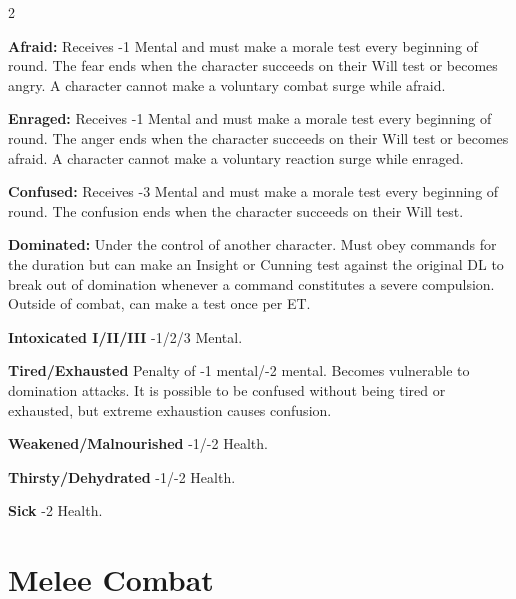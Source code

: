 \begin{multicols}{2}
\begin{proplist}
\item \textbf{Afraid:} Receives -1 Mental and must make a morale test every beginning of round. The fear ends when the character succeeds on their Will test or becomes angry. A character cannot make a voluntary combat surge while afraid.
\item \textbf{Enraged:} Receives -1 Mental and must make a morale test every beginning of round. The anger ends when the character succeeds on their Will test or becomes afraid. A character cannot make a voluntary reaction surge while enraged.
\item \textbf{Confused:} Receives -3 Mental and must make a morale test every beginning of round. The confusion ends when the character succeeds on their Will test.
\item \textbf{Dominated:} Under the control of another character. Must obey commands for the duration but can make an Insight or Cunning test against the original DL to break out of domination whenever a command constitutes a severe compulsion. Outside of combat, can make a test once per ET.

\item \textbf{Intoxicated I/II/III} -1/2/3 Mental.
\item \textbf{Tired/Exhausted} Penalty of -1 mental/-2 mental. Becomes vulnerable to domination attacks. It is possible to be confused without being tired or exhausted, but extreme exhaustion causes confusion.
\item \textbf{Weakened/Malnourished} -1/-2 Health. 
\item \textbf{Thirsty/Dehydrated} -1/-2 Health.
\item \textbf{Sick} -2 Health.
\end{proplist}



\section{Melee Combat}


\end{multicols}
